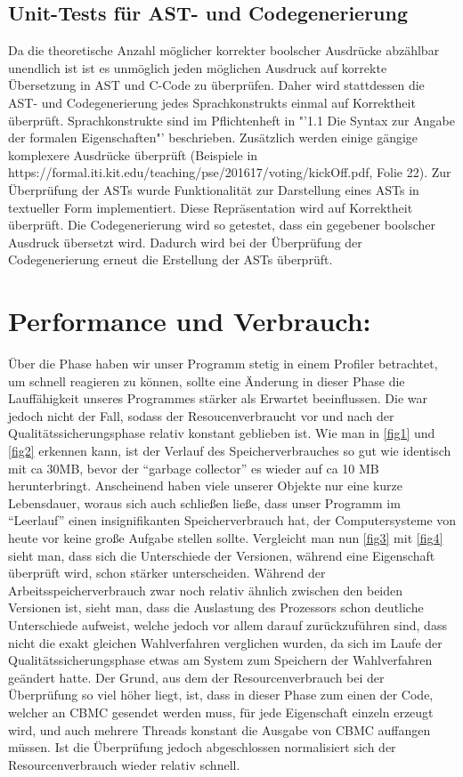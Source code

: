 \documentclass[a4paper]{scrreprt}
\begin{document}
\section{Unit-Tests für AST- und Codegenerierung}
Da die theoretische Anzahl möglicher korrekter boolscher Ausdrücke abzählbar unendlich ist ist es unmöglich jeden möglichen Ausdruck auf korrekte Übersetzung in AST und C-Code zu überprüfen. Daher wird stattdessen die AST- und Codegenerierung jedes Sprachkonstrukts einmal auf Korrektheit überprüft. Sprachkonstrukte sind im Pflichtenheft in "'1.1 Die Syntax zur Angabe der formalen Eigenschaften"' beschrieben. Zusätzlich werden einige gängige komplexere Ausdrücke überprüft (Beispiele in https://formal.iti.kit.edu/teaching/pse/201617/voting/kickOff.pdf, Folie 22). Zur Überprüfung der ASTs wurde Funktionalität zur Darstellung eines ASTs in textueller Form implementiert. Diese Repräsentation wird auf Korrektheit überprüft. Die Codegenerierung wird so getestet, dass ein gegebener boolscher Ausdruck übersetzt wird. Dadurch wird bei der Überprüfung der Codegenerierung erneut die Erstellung der ASTs überprüft. 

\chapter{Performance und Verbrauch:}
Über die Phase haben wir unser Programm stetig in einem Profiler betrachtet, um
schnell reagieren zu können, sollte eine Änderung in dieser Phase die
Lauffähigkeit unseres Programmes stärker als Erwartet beeinflussen.
\newline
Die war jedoch nicht der Fall, sodass der Resoucenverbraucht vor und nach der
Qualitätssicherungsphase relativ konstant geblieben ist.
\newline
Wie man in \ref{fig1} und \ref{fig2} erkennen kann, ist der Verlauf des
Speicherverbrauches so gut wie identisch mit ca 30MB, bevor der "`garbage
collector"' es wieder auf ca 10 MB herunterbringt. Anscheinend haben viele
unserer Objekte nur eine kurze Lebensdauer, woraus sich auch schließen ließe,
dass unser Programm im "`Leerlauf"' einen insignifikanten Speicherverbrauch hat,
der Computersysteme von heute vor keine große Aufgabe stellen sollte.
\newline
Vergleicht man nun \ref{fig3} mit \ref{fig4} sieht man, dass sich die
Unterschiede der Versionen, während eine Eigenschaft überprüft wird, schon
stärker unterscheiden. Während der Arbeitsspeicherverbrauch zwar noch relativ
ähnlich zwischen den beiden Versionen ist, sieht man, dass die Auslastung des
Prozessors schon deutliche Unterschiede aufweist, welche jedoch vor allem darauf
zurückzuführen sind, dass nicht die exakt gleichen Wahlverfahren verglichen
wurden, da sich im Laufe der Qualitätssicherungsphase etwas am System zum
Speichern der Wahlverfahren geändert hatte.
\newline
Der Grund, aus dem der Resourcenverbrauch bei der Überprüfung so viel höher
liegt, ist, dass in dieser Phase zum einen der Code, welcher an CBMC gesendet
werden muss, für jede Eigenschaft einzeln erzeugt wird, und auch mehrere Threads
konstant die Ausgabe von CBMC auffangen müssen.
Ist die Überprüfung jedoch abgeschlossen normalisiert sich der
Resourcenverbrauch wieder relativ schnell.
\end{document}
